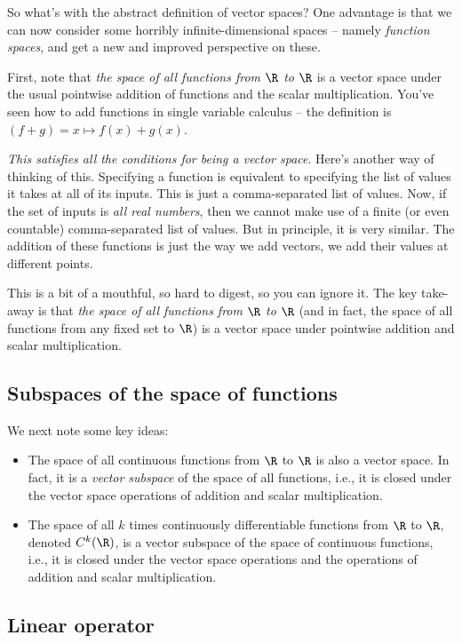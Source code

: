 So what's with the abstract definition of vector spaces? One advantage
is that we can now consider some horribly infinite-dimensional spaces
-- namely {\em function spaces}, and get a new and improved
perspective on these.

First, note that {\em the space of all functions from $\R$ to $\R$} is
a vector space under the usual pointwise addition of functions and the
scalar multiplication. You've seen how to add functions in single
variable calculus -- the definition is $(f + g) = x \mapsto f(x) +
g(x)$.

{\em This satisfies all the conditions for being a vector
space}. Here's another way of thinking of this. Specifying a function
is equivalent to specifying the list of values it takes at all of its
inputs. This is just a comma-separated list of values. Now, if the set
of inputs is {\em all real numbers}, then we cannot make use of a
finite (or even countable) comma-separated list of values. But in
principle, it is very similar. The addition of these functions is just
the way we add vectors, we add their values at different points.

This is a bit of a mouthful, so hard to digest, so you can ignore
it. The key take-away is that {\em the space of all functions from
$\R$ to $\R$} (and in fact, the space of all functions from any fixed
set to $\R$) is a vector space under pointwise addition and scalar
multiplication.

\subsection{Subspaces of the space of functions}

We next note some key ideas:

\begin{itemize}
\item The space of all continuous functions from $\R$ to $\R$ is also
  a vector space. In fact, it is a {\em vector subspace} of the space
  of all functions, i.e., it is closed under the vector space
  operations of addition and scalar multiplication.
\item The space of all $k$ times continuously differentiable functions
  from $\R$ to $\R$, denoted $C^k(\R)$, is a vector subspace of the
  space of continuous functions, i.e., it is closed under the vector
  space operations and the operations of addition and scalar
  multiplication.
\end{itemize}

\subsection{Linear operator}


